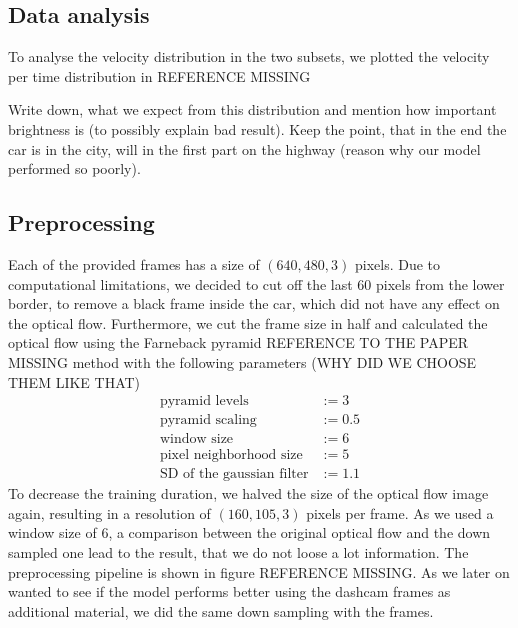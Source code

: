 \documentclass[conference]{IEEEtran}
\begin{document}
\subsection{Data analysis}
To analyse the velocity distribution in the two subsets, we plotted the velocity per time distribution in REFERENCE MISSING

Write down, what we expect from this distribution and mention how important brightness is (to possibly explain bad result). Keep the 
point, that in the end the car is in the city, will in the first part on the highway (reason why our model performed so poorly).

\subsection{Preprocessing}
Each of the provided frames has a size of $(640,480,3)$ pixels. Due to computational limitations, we decided to cut off the last 60 pixels from the lower border, to remove a black frame inside the car, which did not have any effect on the optical flow. Furthermore, we cut the frame size in half and calculated the optical flow using the Farneback pyramid REFERENCE TO THE PAPER MISSING method with the following parameters (WHY DID WE CHOOSE THEM LIKE THAT)
\begin{align*}
\text{pyramid levels} &:= 3\\
\text{pyramid scaling} &:= 0.5\\
\text{window size} &:= 6\\
\text{pixel neighborhood size} &:= 5\\
\text{SD of the gaussian filter} &:= 1.1
\end{align*}
To decrease the training duration, we halved the size of the optical flow image again, resulting in a resolution of
$(160,105,3)$ pixels per frame. As we used a window size of $6$, a comparison between the original optical flow and the down 
sampled one lead to the result, that we do not loose a lot information. The preprocessing pipeline is shown in figure 
REFERENCE MISSING. As we later on wanted to see if the model performs better using the dashcam frames as additional material, 
we did the same down sampling with the frames.
\end{document}
